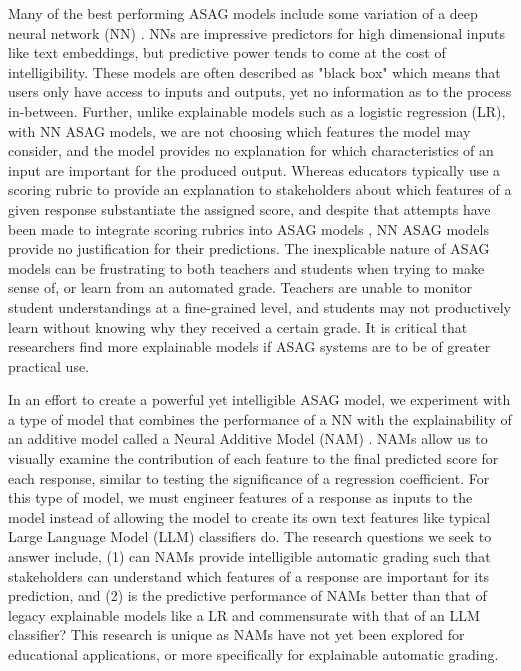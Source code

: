 Many of the best performing ASAG models include some variation of a deep neural network (NN) \cite{haller2022survey}. NNs are impressive predictors for high dimensional inputs like text embeddings, but predictive power tends to come at the cost of intelligibility. These models are often described as "black box" which means that users only have access to inputs and outputs, yet no information as to the process in-between. Further, unlike explainable models such as a logistic regression (LR), with NN ASAG models, we are not choosing which features the model may consider, and the model provides no explanation for which characteristics of an input are important for the produced output. Whereas educators typically use a scoring rubric to provide an explanation to stakeholders about which features of a given response substantiate the assigned score, and despite that attempts have been made to integrate scoring rubrics into ASAG models \cite{condor2022representing}, NN ASAG models provide no justification for their predictions. The inexplicable nature of ASAG models can be frustrating to both teachers and students when trying to make sense of, or learn from an automated grade. Teachers are unable to monitor student understandings at a fine-grained level, and students may not productively learn without knowing why they received a certain grade. It is critical that researchers find more explainable models if ASAG systems are to be of greater practical use.

In an effort to create a powerful yet intelligible ASAG model, we experiment with a type of model that combines the performance of a NN with the explainability of an additive model called a Neural Additive Model (NAM) \cite{agarwal2020neural}. NAMs allow us to visually examine the contribution of each feature to the final predicted score for each response, similar to testing the significance of a regression coefficient. For this type of model, we must engineer features of a response as inputs to the model instead of allowing the model to create its own text features like typical Large Language Model (LLM) classifiers do. The research questions we seek to answer include, (1) can NAMs provide intelligible automatic grading such that stakeholders can understand which features of a response are important for its prediction, and (2) is the predictive performance of NAMs better than that of legacy explainable models like a LR and commensurate with that of an LLM classifier? This research is unique as NAMs have not yet been explored for educational applications, or more specifically for explainable automatic grading. 

